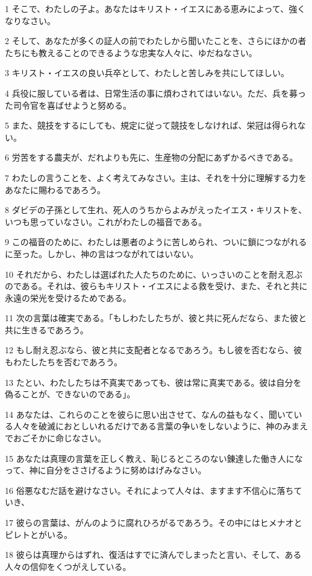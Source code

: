 \par 1 そこで、わたしの子よ。あなたはキリスト・イエスにある恵みによって、強くなりなさい。
\par 2 そして、あなたが多くの証人の前でわたしから聞いたことを、さらにほかの者たちにも教えることのできるような忠実な人々に、ゆだねなさい。
\par 3 キリスト・イエスの良い兵卒として、わたしと苦しみを共にしてほしい。
\par 4 兵役に服している者は、日常生活の事に煩わされてはいない。ただ、兵を募った司令官を喜ばせようと努める。
\par 5 また、競技をするにしても、規定に従って競技をしなければ、栄冠は得られない。
\par 6 労苦をする農夫が、だれよりも先に、生産物の分配にあずかるべきである。
\par 7 わたしの言うことを、よく考えてみなさい。主は、それを十分に理解する力をあなたに賜わるであろう。
\par 8 ダビデの子孫として生れ、死人のうちからよみがえったイエス・キリストを、いつも思っていなさい。これがわたしの福音である。
\par 9 この福音のために、わたしは悪者のように苦しめられ、ついに鎖につながれるに至った。しかし、神の言はつながれてはいない。
\par 10 それだから、わたしは選ばれた人たちのために、いっさいのことを耐え忍ぶのである。それは、彼らもキリスト・イエスによる救を受け、また、それと共に永遠の栄光を受けるためである。
\par 11 次の言葉は確実である。「もしわたしたちが、彼と共に死んだなら、また彼と共に生きるであろう。
\par 12 もし耐え忍ぶなら、彼と共に支配者となるであろう。もし彼を否むなら、彼もわたしたちを否むであろう。
\par 13 たとい、わたしたちは不真実であっても、彼は常に真実である。彼は自分を偽ることが、できないのである」。
\par 14 あなたは、これらのことを彼らに思い出させて、なんの益もなく、聞いている人々を破滅におとしいれるだけである言葉の争いをしないように、神のみまえでおごそかに命じなさい。
\par 15 あなたは真理の言葉を正しく教え、恥じるところのない錬達した働き人になって、神に自分をささげるように努めはげみなさい。
\par 16 俗悪なむだ話を避けなさい。それによって人々は、ますます不信心に落ちていき、
\par 17 彼らの言葉は、がんのように腐れひろがるであろう。その中にはヒメナオとピレトとがいる。
\par 18 彼らは真理からはずれ、復活はすでに済んでしまったと言い、そして、ある人々の信仰をくつがえしている。
